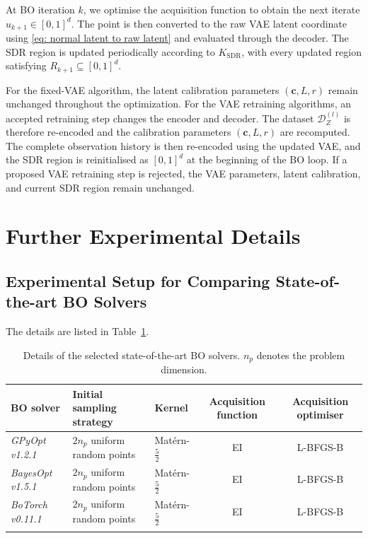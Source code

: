 \documentclass[pdflatex,sn-mathphys-num]{sn-jnl}%
\theoremstyle{thmstyleone}%
\theoremstyle{thmstyletwo}%
\theoremstyle{thmstylethree}%
\begin{document}
\begin{appendices}
At BO iteration \(k\),  we optimise the acquisition function to obtain the next iterate $u_{k+1} \in [0, 1]^d$. The point is then converted to the raw VAE latent coordinate using \eqref{eq: normal latent to raw latent} and evaluated through the decoder. The SDR region is updated periodically according to \(K_{\mathrm{SDR}}\), with every updated region satisfying $R_{k+1}\subseteq[0,1]^d.$

For the fixed-VAE algorithm, the latent calibration parameters \((\mathbf{c},L,r)\) remain unchanged throughout the optimization. For the VAE
retraining algorithms, an accepted retraining step changes the encoder and decoder. The dataset $\mathcal{D}_Z^{(l)}$ is therefore re-encoded and the calibration parameters \((\mathbf{c},L,r)\) are recomputed. The complete observation history is then re-encoded using the updated VAE, and the SDR region is reinitialised as $[0, 1]^d$ at the beginning of the BO loop. If a proposed VAE retraining step is rejected, the VAE parameters, latent
calibration, and current SDR region remain unchanged.

\section{Further Experimental Details}


\subsection{Experimental Setup for Comparing State-of-the-art BO Solvers}\label{Appendix: BO Solver Exp Setup Details}
The details are listed in Table~\ref{tab: BO solver table exp details}.
\begin{table}[h]
\caption{Details of the selected state-of-the-art BO solvers. $n_p$ denotes the problem dimension.}
\label{tab: BO solver table exp details}
\centering
\begin{tabular}{@{}l l l c c@{}}
\toprule
BO solver & Initial sampling strategy & Kernel & Acquisition function & Acquisition optimiser \\
\midrule
\textit{GPyOpt} \textit{v1.2.1}   & $2n_p$ uniform random points & Matérn-$\tfrac{5}{2}$ & EI & L-BFGS-B \\
\textit{BayesOpt} \textit{v1.5.1}  & $2n_p$ uniform random points & Matérn-$\tfrac{5}{2}$ & EI & L-BFGS-B \\
\textit{BoTorch} \textit{v0.11.1}  & $2n_p$ uniform random points & Matérn-$\tfrac{5}{2}$ & EI & L-BFGS-B \\
\botrule
\end{tabular}
\end{table}


\end{appendices}
\end{document}
